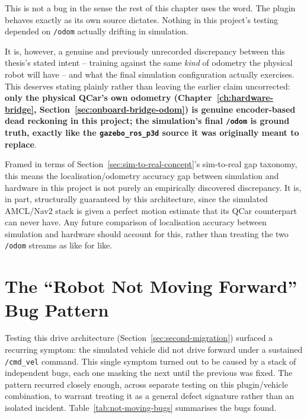 This is not a bug in the sense the rest of this chapter uses the
word. The plugin behaves exactly as its own source dictates.
Nothing in this project's testing depended on \texttt{/odom} actually
drifting in simulation.

It is, however, a genuine and previously unrecorded discrepancy
between this thesis's stated intent -- training against the same
\emph{kind} of odometry the physical robot will have -- and what the
final simulation configuration actually exercises. This deserves
stating plainly rather than leaving the earlier claim uncorrected:
\textbf{only the physical QCar's own odometry
(Chapter~\ref{ch:hardware-bridge}, Section~\ref{sec:onboard-bridge-odom})
is genuine encoder-based dead reckoning in this project; the
simulation's final \texttt{/odom} is ground truth, exactly like the
\texttt{gazebo\_ros\_p3d} source it was originally meant to replace}.

Framed in terms of Section~\ref{sec:sim-to-real-concept}'s
sim-to-real gap taxonomy, this means the localisation/odometry
accuracy gap between simulation and hardware in this project is not
purely an empirically discovered discrepancy. It is, in part,
structurally guaranteed by this architecture, since the simulated
AMCL/Nav2 stack is given a perfect motion estimate that its
QCar counterpart can never have. Any future comparison of
localisation accuracy between simulation and hardware should account
for this, rather than treating the two \texttt{/odom} streams as
like for like.

\section{The ``Robot Not Moving Forward'' Bug Pattern}
\label{sec:not-moving-bug}

Testing this drive architecture (Section~\ref{sec:second-migration})
surfaced a recurring symptom: the simulated vehicle did not drive
forward under a sustained \texttt{/cmd\_vel} command. This single
symptom turned out to be caused by a stack of independent bugs, each
one masking the next until the previous was fixed. The pattern
recurred closely enough, across separate testing on this
plugin/vehicle combination, to warrant treating it as a general
defect signature rather than an isolated incident.
Table~\ref{tab:not-moving-bugs} summarises the bugs found.

